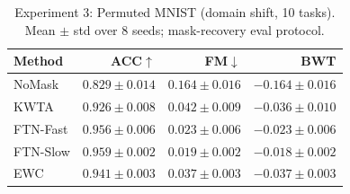 \begin{table}[h]
\centering
\caption{Experiment 3: Permuted MNIST (domain shift, 10 tasks).  Mean $\pm$ std over 8 seeds; mask-recovery eval protocol.}
\label{tab:exp3}
\begin{tabular}{l rrr}
\toprule
Method & ACC$\uparrow$ & FM$\downarrow$ & BWT \\
\midrule
NoMask & $0.829\pm0.014$ & $0.164\pm0.016$ & $-0.164\pm0.016$ \\
KWTA & $0.926\pm0.008$ & $0.042\pm0.009$ & $-0.036\pm0.010$ \\
FTN-Fast & $0.956\pm0.006$ & $0.023\pm0.006$ & $-0.023\pm0.006$ \\
FTN-Slow & $0.959\pm0.002$ & $0.019\pm0.002$ & $-0.018\pm0.002$ \\
EWC & $0.941\pm0.003$ & $0.037\pm0.003$ & $-0.037\pm0.003$ \\
\bottomrule
\end{tabular}
\end{table}
